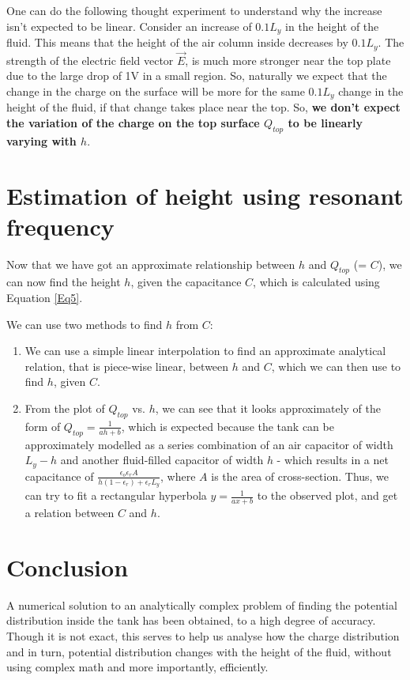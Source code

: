 \documentclass[11pt, a4paper, twoside]{report}
\begin{document}
        One can do the following thought experiment to understand why the increase isn't expected to be linear.
        Consider an increase of $0.1L_y$ in the height of the fluid. This means that the height of the air column inside decreases by $0.1L_y$. The strength of the electric field vector $\vec{E}$, is much more stronger near the top plate due to the large drop of 1V in a small region. So, naturally we expect that the change in the charge on the surface will be more for the same $0.1L_y$ change in the height of the fluid, if that change takes place near the top. So, \textbf{we don't expect the variation of the charge on the top surface $Q_{top}$ to be linearly varying with $h$}.

    \section{Estimation of height using resonant frequency}
        Now that we have got an approximate relationship between $h$ and $Q_{top}$ (= $C$), we can now find the height $h$, given the capacitance $C$, which is calculated using Equation \eqref{Eq5}.

        We can use two methods to find $h$ from $C$:
        \begin{enumerate}
            \item We can use a simple linear interpolation to find an approximate analytical relation, that is piece-wise linear, between $h$ and $C$, which we can then use to find $h$, given $C$.
            \item From the plot of $Q_{top}$ vs. $h$, we can see that it looks approximately of the form of $Q_{top} = \frac{1}{ah+b}$, which is expected because the tank can be approximately modelled as a series combination of an air capacitor of width $L_y-h$ and another fluid-filled capacitor of width $h$ - which results in a net capacitance of $\frac{\epsilon_o \epsilon_r A}{h(1-\epsilon_r)+\epsilon_rL_y}$, where $A$ is the area of cross-section. Thus, we can try to fit a rectangular hyperbola $y = \frac{1}{ax+b}$ to the observed plot, and get a relation between $C$ and $h$.
        \end{enumerate}

    \section{Conclusion}
        A numerical solution to an analytically complex problem of finding the potential distribution inside the tank has been obtained, to a high degree of accuracy. Though it is not exact, this serves to help us analyse how the charge distribution and in turn, potential distribution changes with the height of the fluid, without using complex math and more importantly, efficiently.


    
    
\end{document}
